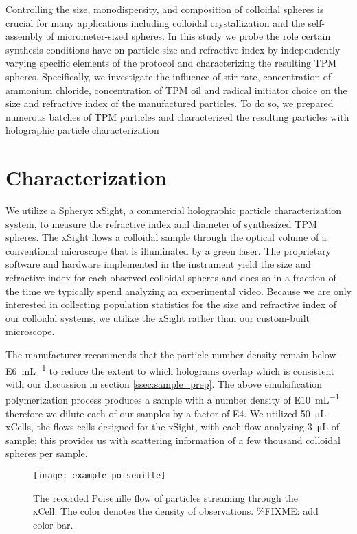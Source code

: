 Controlling the size, monodispersity, and composition of colloidal spheres is crucial
for many applications including colloidal crystallization and the self-assembly of
micrometer-sized spheres. In this study we probe the role certain synthesis conditions
have on particle size and refractive index by independently varying specific elements
of the protocol and characterizing the resulting TPM spheres. Specifically,
we investigate the influence of stir rate, concentration of ammonium chloride,
concentration of TPM oil and radical initiator choice on the size and refractive index
of the manufactured particles. To do so, we prepared numerous batches of TPM particles and
characterized the resulting particles with holographic particle characterization

\section{Characterization}

We utilize a Spheryx xSight, a commercial holographic particle characterization system,
to measure the  refractive index and diameter of synthesized TPM spheres.
The xSight flows a colloidal sample through the optical volume of a conventional microscope
that is illuminated by a green laser. The proprietary software and hardware implemented in
the instrument yield the size and refractive index for each observed colloidal spheres and
does so in a fraction of the time we typically spend analyzing an experimental video.
Because we are only interested in collecting population statistics for the size and refractive
index of our colloidal systems, we utilize the xSight rather than our custom-built microscope.

The manufacturer recommends that the particle number density remain below 
\SI{E6}{\milli\liter^{-1}} to reduce the extent to which holograms overlap which
is consistent with our discussion in section \ref{ssec:sample_prep}.
The above emulsification polymerization process produces a sample with a number
density of \SI{E10}{\milli\liter^{-1}} therefore we dilute each of our samples
by a factor of \si{E4}. We utilized \SI{50}{\micro \liter} xCells, the flows cells
designed for the xSight, with each flow analyzing \SI{3}{\micro\liter} of sample;
this provides us with scattering information of a few thousand colloidal spheres per sample.

\begin{figure}
    \centering
    \texttt{[image: example\_poiseuille]}
    \caption{The recorded Poiseuille flow of particles streaming through the xCell. The
      color denotes the density of observations. \%FIXME: add color bar.}
    \label{fig:flow_prof}
\end{figure}

